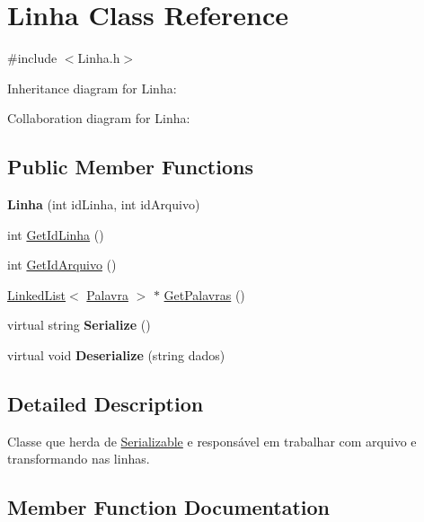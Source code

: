 \hypertarget{class_linha}{}\section{Linha Class Reference}
\label{class_linha}


{\ttfamily \#include $<$Linha.\+h$>$}



Inheritance diagram for Linha\+:


Collaboration diagram for Linha\+:
\subsection*{Public Member Functions}
\begin{DoxyCompactItemize}
\item 
{\bfseries Linha} (int id\+Linha, int id\+Arquivo)\hypertarget{class_linha_aec494ca6d3050a520e5aacaeb2fa994e}{}\label{class_linha_aec494ca6d3050a520e5aacaeb2fa994e}

\item 
int \hyperlink{class_linha_a82f86629d3057e805506be0740eef6f2}{Get\+Id\+Linha} ()
\item 
int \hyperlink{class_linha_a63b2a60b1df0ab5cac09f0c5dd373edf}{Get\+Id\+Arquivo} ()
\item 
\hyperlink{class_linked_list}{Linked\+List}$<$ \hyperlink{class_palavra}{Palavra} $>$ $\ast$ \hyperlink{class_linha_a62548d6970f6e2b075f9548e9047c1f3}{Get\+Palavras} ()
\item 
virtual string {\bfseries Serialize} ()\hypertarget{class_linha_a3a9a6f6f2384023546f98ff8050a5941}{}\label{class_linha_a3a9a6f6f2384023546f98ff8050a5941}

\item 
virtual void {\bfseries Deserialize} (string dados)\hypertarget{class_linha_a61ff79a4765d2ee03a8a07e0f2418537}{}\label{class_linha_a61ff79a4765d2ee03a8a07e0f2418537}

\end{DoxyCompactItemize}


\subsection{Detailed Description}
Classe que herda de \hyperlink{class_serializable}{Serializable} e responsável em trabalhar com arquivo e transformando nas linhas. 

\subsection{Member Function Documentation}
